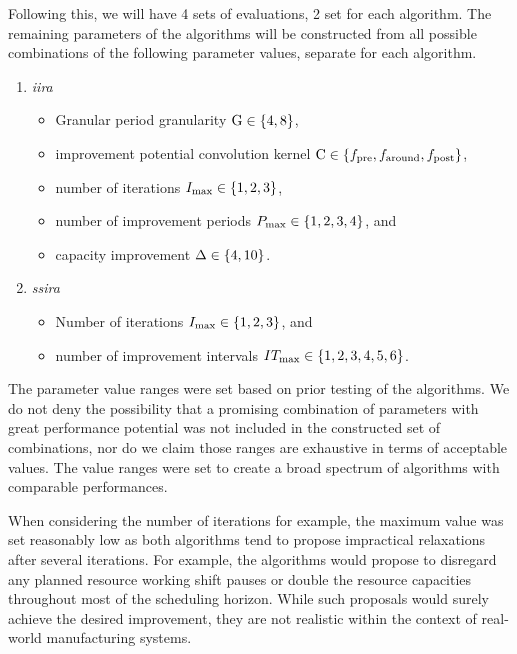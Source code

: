 Following this, we will have 4 sets of evaluations, 2 set for each algorithm.
The remaining parameters of the algorithms will be constructed from all possible combinations
of the following parameter values, separate for each algorithm.
\begin{enumerate}[label=(\roman*)]
    \item \emph{\acl{iira}}
        \begin{itemize}
            \item Granular period granularity $\mathrm{G} \in \{ 4, 8 \}$,
            \item improvement potential convolution kernel $\mathrm{C} \in \{ f_{\text{pre}}, f_{\text{around}}, f_{\text{post}} \}$, 
            \item number of iterations $I_{\max} \in \{ 1, 2, 3 \}$,
            \item number of improvement periods $P_{\max} \in \{ 1, 2, 3, 4 \}$, and
            \item capacity improvement $\Delta \in \{ 4, 10 \}$.
        \end{itemize}

    \item {\emph{\acl{ssira}}}
        \begin{itemize}
            \item Number of iterations $I_{\max} \in \{ 1, 2, 3 \}$, and
            \item number of improvement intervals $IT_{\max} \in \{ 1, 2, 3, 4, 5, 6 \}$.
        \end{itemize}
\end{enumerate}

The parameter value ranges were set based on prior testing of the algorithms.
We do not deny the possibility that a promising combination of parameters
with great performance potential was not included in the constructed set of combinations,
nor do we claim those ranges are exhaustive in terms of acceptable values.
The value ranges were set to create a broad spectrum of algorithms with comparable performances.

When considering the number of iterations for example,
the maximum value was set reasonably low as both algorithms
tend to propose impractical relaxations after several iterations.
For example, the algorithms would propose to disregard any planned resource working shift pauses
or double the resource capacities throughout most of the scheduling horizon.
While such proposals would surely achieve the desired improvement,
they are not realistic within the context of real-world manufacturing systems.

